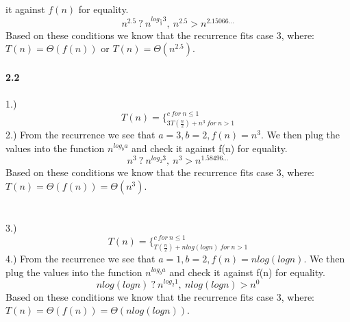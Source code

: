 \documentclass[page=4,11pt]{article}
\begin{document}
it against $f(n)$ for equality.
$$n^{2.5}\ ?\ n^{log_{\frac{5}{3}}3},\ n^{2.5}>n^{2.15066 \dots}$$
Based on these conditions we know that the recurrence fits case 3, 
where: $T(n)= \Theta(f(n))$ or $T(n)=  \Theta(n^{2.5})$.\\ \\
\textbf{2.2}\\ \\
1.) $$T(n)= \Bigg\{_{3T(\frac{n}{2})+n^3\ for\ n>1}^{c\ for\ n \leq 1}$$
2.) From the recurrence we see that $a=3,b=2,f(n)=n^3$. We then plug the values into the function $n^{log_{b}a}$ and check it against f(n) for equality. 
$$n^3\ ?\ n^{log_{2}3},\ n^3>n^{1.58496 \dots}$$
Based on these conditions we know that the recurrence fits case 3, where: $T(n)= \Theta (f(n))= \Theta(n^3)$.\\ \\ \\
3.)$$T(n)= \Bigg\{_{T(\frac{n}{2})+nlog(logn)\ for\ n>1}^{c\ for\ n \leq 1}$$
4.) From the recurrence we see that $a=1,b=2,f(n)=nlog(logn)$. We then plug the values into the function $n^{log_{b}a}$ and check it against f(n) for equality. 
$$nlog(logn)\ ?\ n^{log_{2}1},\ nlog(logn)>n^0$$
Based on these conditions we know that the recurrence fits case 3, where: $T(n)= \Theta (f(n))= \Theta(nlog(logn))$.\\ \\
\end{document}
